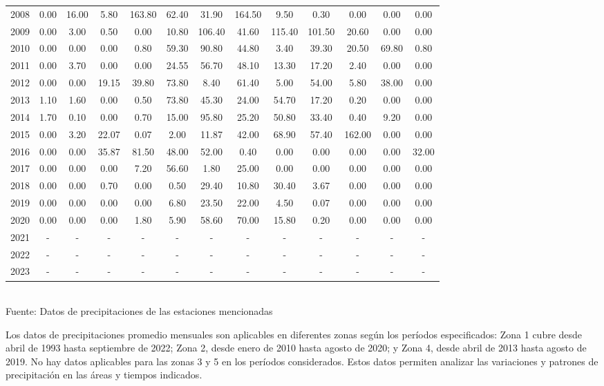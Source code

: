 \documentclass{article} %
\begin{document}
\begin{table}[H]
{\begin{tabular}{|c|c|c|c|c|c|c|c|c|c|c|c|c|}
    2008 & 0.00 & 16.00 & 5.80 & 163.80 & 62.40 & 31.90 & 164.50 & 9.50 & 0.30 & 0.00 & 0.00 & 0.00 \\
    2009 & 0.00 & 3.00 & 0.50 & 0.00 & 10.80 & 106.40 & 41.60 & 115.40 & 101.50 & 20.60 & 0.00 & 0.00 \\
    2010 & 0.00 & 0.00 & 0.00 & 0.80 & 59.30 & 90.80 & 44.80 & 3.40 & 39.30 & 20.50 & 69.80 & 0.80 \\
    2011 & 0.00 & 3.70 & 0.00 & 0.00 & 24.55 & 56.70 & 48.10 & 13.30 & 17.20 & 2.40 & 0.00 & 0.00 \\
    2012 & 0.00 & 0.00 & 19.15 & 39.80 & 73.80 & 8.40 & 61.40 & 5.00 & 54.00 & 5.80 & 38.00 & 0.00 \\
    2013 & 1.10 & 1.60 & 0.00 & 0.50 & 73.80 & 45.30 & 24.00 & 54.70 & 17.20 & 0.20 & 0.00 & 0.00 \\
    2014 & 1.70 & 0.10 & 0.00 & 0.70 & 15.00 & 95.80 & 25.20 & 50.80 & 33.40 & 0.40 & 9.20 & 0.00 \\
    2015 & 0.00 & 3.20 & 22.07 & 0.07 & 2.00 & 11.87 & 42.00 & 68.90 & 57.40 & 162.00 & 0.00 & 0.00 \\
    2016 & 0.00 & 0.00 & 35.87 & 81.50 & 48.00 & 52.00 & 0.40 & 0.00 & 0.00 & 0.00 & 0.00 & 32.00 \\
    2017 & 0.00 & 0.00 & 0.00 & 7.20 & 56.60 & 1.80 & 25.00 & 0.00 & 0.00 & 0.00 & 0.00 & 0.00 \\
    2018 & 0.00 & 0.00 & 0.70 & 0.00 & 0.50 & 29.40 & 10.80 & 30.40 & 3.67 & 0.00 & 0.00 & 0.00 \\
    2019 & 0.00 & 0.00 & 0.00 & 0.00 & 6.80 & 23.50 & 22.00 & 4.50 & 0.07 & 0.00 & 0.00 & 0.00 \\
    2020 & 0.00 & 0.00 & 0.00 & 1.80 & 5.90 & 58.60 & 70.00 & 15.80 & 0.20 & 0.00 & 0.00 & 0.00 \\
    2021 & - & - & - & - & - & - & - & - & - & - & - & - \\
    2022 & - & - & - & - & - & - & - & - & - & - & - & - \\
    2023 & - & - & - & - & - & - & - & - & - & - & - & - \\
    \hline
    \end{tabular}%
    }
    \label{tab:precipitaciones_promedio}
    \vspace{0.2cm}
    \\Fuente: Datos de precipitaciones de las estaciones mencionadas
\end{table}

Los datos de precipitaciones promedio mensuales son aplicables en diferentes zonas según los períodos especificados: Zona 1 cubre desde abril de 1993 hasta septiembre de 2022; Zona 2, desde enero de 2010 hasta agosto de 2020; y Zona 4, desde abril de 2013 hasta agosto de 2019. No hay datos aplicables para las zonas 3 y 5 en los períodos considerados. Estos datos permiten analizar las variaciones y patrones de precipitación en las áreas y tiempos indicados.
\end{document}
